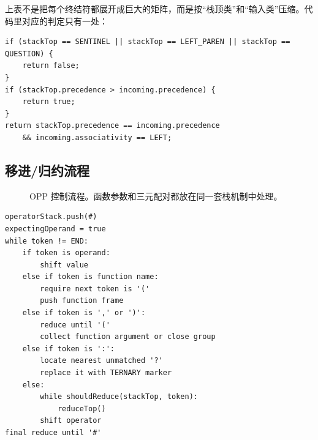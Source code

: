 \documentclass[12pt,a4paper,fontset=none]{ctexart}
\begin{document}
上表不是把每个终结符都展开成巨大的矩阵，而是按“栈顶类”和“输入类”压缩。代码里对应的判定只有一处：

\begin{lstlisting}[style=labcode,caption={OperatorTable 中的归约条件（节选）}]
if (stackTop == SENTINEL || stackTop == LEFT_PAREN || stackTop == QUESTION) {
    return false;
}
if (stackTop.precedence > incoming.precedence) {
    return true;
}
return stackTop.precedence == incoming.precedence
    && incoming.associativity == LEFT;
\end{lstlisting}

\subsection{移进/归约流程}

\begin{figure}[H]
  \centering
  \caption{OPP 控制流程。函数参数和三元配对都放在同一套栈机制中处理。}
\end{figure}

\begin{lstlisting}[style=labcode,caption={Parser 主流程伪码}]
operatorStack.push(#)
expectingOperand = true
while token != END:
    if token is operand:
        shift value
    else if token is function name:
        require next token is '('
        push function frame
    else if token is ',' or ')':
        reduce until '('
        collect function argument or close group
    else if token is ':':
        locate nearest unmatched '?'
        replace it with TERNARY marker
    else:
        while shouldReduce(stackTop, token):
            reduceTop()
        shift operator
final reduce until '#'
\end{lstlisting}
\end{document}
